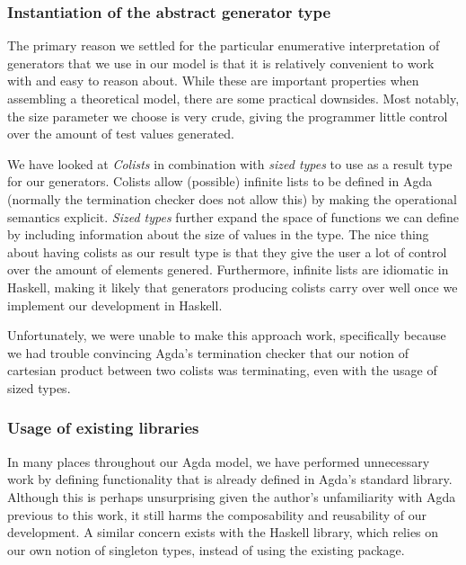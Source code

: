 \documentclass[a4paper,msc,twosized=semi]{uustthesis}
\let\oldemph\emph
\renewcommand\emph[1]{{\large\oldemph{#1}}}
\begin{document}
\subsubsection{Instantiation of the abstract generator type}

  The primary reason we settled for the particular enumerative interpretation of 
  generators that we use in our model is that it is relatively convenient to work
  with and easy to reason about. While these are important properties when assembling
  a theoretical model, there are some practical downsides. Most notably, the size parameter 
  we choose is very crude, giving the programmer little control over the amount of 
  test values generated. 

  We have looked at \emph{Colists} in combination with \emph{sized types} 
  \cite{abel2010miniagda} to use as a result type for our generators. Colists allow 
  (possible) infinite lists to be defined in Agda (normally the termination checker
  does not allow this) by making the operational semantics explicit. \emph{Sized types}
  further expand the space of functions we can define by including information about 
  the size of values in the type. The nice thing about having colists as our result 
  type is that they give the user a lot of control over the amount of elements genered.   
  Furthermore, infinite lists are idiomatic in Haskell, making it likely that generators 
  producing colists carry over well once we implement our development in Haskell. 

  Unfortunately, we were unable to make this approach work, specifically because we had 
  trouble convincing Agda's termination checker that our notion of cartesian product 
  between two colists was terminating, even with the usage of sized types. 

\subsubsection{Usage of existing libraries}

  In many places throughout our Agda model, we have performed unnecessary work by 
  defining functionality that is already defined in Agda's standard library. Although 
  this is perhaps unsurprising given the author's unfamiliarity with Agda previous to 
  this work, it still harms the composability and reusability of our development. A 
  similar concern exists with the Haskell library, which relies on our own notion of 
  singleton types, instead of using the existing package.  
\end{document}
